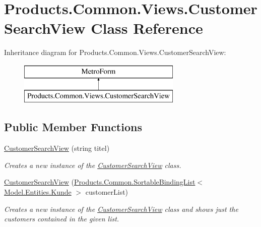 \hypertarget{class_products_1_1_common_1_1_views_1_1_customer_search_view}{}\section{Products.\+Common.\+Views.\+Customer\+Search\+View Class Reference}
\label{class_products_1_1_common_1_1_views_1_1_customer_search_view}
Inheritance diagram for Products.\+Common.\+Views.\+Customer\+Search\+View\+:\begin{figure}[H]
\begin{center}
\leavevmode
\includegraphics[height=2.000000cm]{class_products_1_1_common_1_1_views_1_1_customer_search_view}
\end{center}
\end{figure}
\subsection*{Public Member Functions}
\begin{DoxyCompactItemize}
\item 
\hyperlink{class_products_1_1_common_1_1_views_1_1_customer_search_view_a10105eead1acdc200f74f19b51ec8b46}{Customer\+Search\+View} (string titel)
\begin{DoxyCompactList}\small\item\em Creates a new instance of the \hyperlink{class_products_1_1_common_1_1_views_1_1_customer_search_view}{Customer\+Search\+View} class. \end{DoxyCompactList}\item 
\hyperlink{class_products_1_1_common_1_1_views_1_1_customer_search_view_ac5f7c35dc97879101929466e6a2ef6dd}{Customer\+Search\+View} (\hyperlink{class_products_1_1_common_1_1_sortable_binding_list}{Products.\+Common.\+Sortable\+Binding\+List}$<$ \hyperlink{class_products_1_1_model_1_1_entities_1_1_kunde}{Model.\+Entities.\+Kunde} $>$ customer\+List)
\begin{DoxyCompactList}\small\item\em Creates a new instance of the \hyperlink{class_products_1_1_common_1_1_views_1_1_customer_search_view}{Customer\+Search\+View} class and shows just the customers contained in the given list. \end{DoxyCompactList}\end{DoxyCompactItemize}
